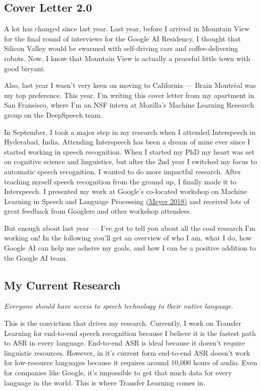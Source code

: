 \documentclass[12pt,a4paper]{article}
\begin{document}
\subsection*{Cover Letter 2.0}


A lot has changed since last year. Last year, before I arrived in Mountain View for the final round of interviews for the Google AI Residency, I thought that Silicon Valley would be swarmed with self-driving cars and coffee-delivering robots. Now, I know that Mountain View is actually a peaceful little town with good biryani.

Also, last year I wasn't very keen on moving to California --- Brain Montr\'eal was my top preference. This year, I'm writing this cover letter from my apartment in San Fransisco, where I'm an NSF intern at Mozilla's Machine Learning Research group on the DeepSpeech team.

In September, I took a major step in my research when I attended Interspeech in Hyderabad, India. Attending Interspeech has been a dream of mine ever since I started working in speech recognition. When I started my PhD my heart was set on cognitive science and linguistics, but after the 2nd year I switched my focus to automatic speech recognition. I wanted to do more impactful research. After teaching myself speech recognition from the ground up, I finally made it to Interspeech. I presented my work at Google's co-located workshop on Machine Learning in Speech and Language Processing \href{https://sites.google.com/view/mlslp/proceedings}{(Meyer 2018)} and received lots of great feedback from Googlers and other workshop attendees.

But enough about last year --- I've got to tell you about all the cool research I'm working on! In the following you'll get an overview of who I am, what I do, how Google AI can help me acheive my goals, and how I can be a positive addition to the Google AI team.


\subsection*{My Current Research}

\begin{center}
\textit{Everyone should have access to speech technology in their native language.}
\end{center}

This is the conviction that drives my research. Currently, I work on Transfer Learning for end-to-end speech recognition because I believe it is the fastest path to ASR in every language. End-to-end ASR is ideal because it doesn't require linguistic resources. However, in it's current form end-to-end ASR doesn't work for low-resource languages because it requires around 10,000 hours of audio. Even for companies like Google, it's impossible to get that much data for every language in the world. This is where Transfer Learning comes in.
\end{document}
